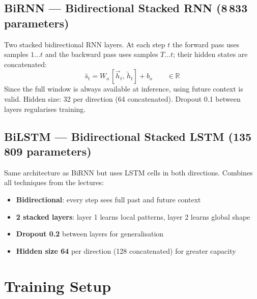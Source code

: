 \documentclass[12pt, a4paper]{article}
\begin{document}
\subsection{BiRNN — Bidirectional Stacked RNN (8\,833 parameters)}

Two stacked bidirectional RNN layers.
At each step $t$ the forward pass uses samples $1\ldots t$ and the
backward pass uses samples $T\ldots t$; their hidden states are
concatenated:
\begin{equation}
    \hat{s}_t = W_o\,[\overrightarrow{h}_t,\,\overleftarrow{h}_t] + b_o
    \qquad \in \mathbb{R}
\end{equation}
Since the full window is always available at inference, using future context
is valid. Hidden size: 32 per direction (64 concatenated). Dropout 0.1
between layers regularises training.

\subsection{BiLSTM — Bidirectional Stacked LSTM (135\,809 parameters)}

Same architecture as BiRNN but uses LSTM cells in both directions.
Combines all techniques from the lectures:
\begin{itemize}[noitemsep]
    \item \textbf{Bidirectional}: every step sees full past and future context
    \item \textbf{2 stacked layers}: layer 1 learns local patterns, layer 2 learns global shape
    \item \textbf{Dropout 0.2} between layers for generalisation
    \item \textbf{Hidden size 64} per direction (128 concatenated) for greater capacity
\end{itemize}

\section{Training Setup}
\end{document}
